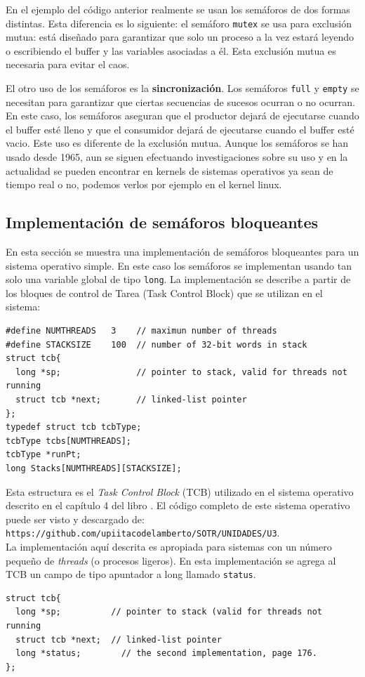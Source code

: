 \documentclass{article}
\begin{document}
En el ejemplo del c\'odigo anterior realmente se usan los sem\'aforos de dos formas 
distintas. Esta diferencia es lo siguiente: el sem\'aforo {\tt mutex} se usa para 
exclusi\'on mutua: est\'a dise\~nado para garantizar que solo un proceso a la vez estar\'a 
leyendo o escribiendo el buffer y las variables asociadas a \'el. Esta exclusi\'on mutua es 
necesaria para evitar el caos.

El otro uso de los sem\'aforos es la {\bf sincronizaci\'on}. Los sem\'aforos {\tt full} y 
{\tt empty} se necesitan para garantizar que ciertas secuencias de sucesos ocurran o no 
ocurran. En este caso, los sem\'aforos aseguran que el productor dejar\'a de ejecutarse 
cuando el buffer est\'e lleno y que el consumidor dejar\'a de ejecutarse cuando el buffer 
est\'e vacio. Este uso es diferente de la exclusi\'on mutua. Aunque los sem\'aforos se han 
usado desde 1965, aun se siguen efectuando investigaciones sobre su uso y en la actualidad 
se pueden encontrar en kernels de sistemas operativos ya sean de tiempo real o no, podemos 
verlos por ejemplo en el kernel linux.

\eject
\subsection{Implementaci\'on de sem\'aforos bloqueantes}
En esta secci\'on se muestra una implementaci\'on de sem\'aforos bloqueantes para un 
sistema operativo simple. En este caso los sem\'aforos se implementan usando tan solo una 
variable global de tipo {\tt long}. La implementaci\'on se describe a partir de los bloques 
de control de Tarea (Task Control Block) que se utilizan en el sistema:
\begin{verbatim}
#define NUMTHREADS   3    // maximun number of threads
#define STACKSIZE    100  // number of 32-bit words in stack
struct tcb{
  long *sp;               // pointer to stack, valid for threads not running
  struct tcb *next;       // linked-list pointer
};
typedef struct tcb tcbType;
tcbType tcbs[NUMTHREADS];
tcbType *runPt;
long Stacks[NUMTHREADS][STACKSIZE];
\end{verbatim}
Esta estructura es el {\it Task Control Block} (TCB) utilizado en el sistema operativo 
descrito en el cap\'itulo 4 del libro \cite{Valvano}. El c\'odigo completo de este 
sistema operativo puede ser visto y descargado de:\\
{\tt https://github.com/upiitacodelamberto/SOTR/UNIDADES/U3}.\\
La implementaci\'on aqu\'i descrita es apropiada para sistemas con un 
n\'umero  peque\~no de {\it threads} (o procesos ligeros). En esta implementaci\'on 
se agrega al TCB un campo de tipo apuntador a long llamado {\tt status}. 
\begin{verbatim}
struct tcb{
  long *sp;          // pointer to stack (valid for threads not running
  struct tcb *next;  // linked-list pointer
  long *status;        // the second implementation, page 176.
};
\end{verbatim}
\end{document}
